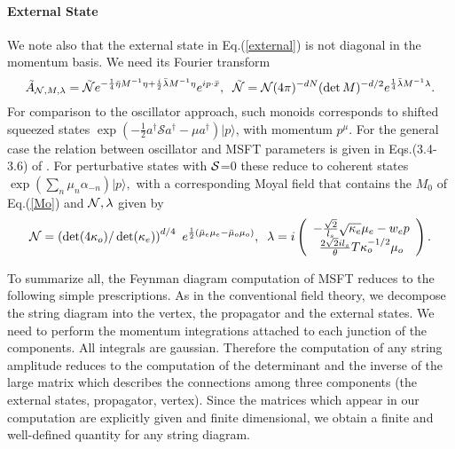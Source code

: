 \documentclass[a4paper,11pt]{article}
\begin{document}
\paragraph{External State}

We note also that the external state in Eq.(\ref{external}) is not diagonal
in the momentum basis. We need its Fourier transform
\begin{equation}
\tilde{A}_{\mathcal{N},M,\lambda }=\tilde{\mathcal{N}}e^{-\frac{1}{4}\bar{%
\eta}M^{-1}\eta +\frac{i}{2}\bar{\lambda}M^{-1}\eta }e^{ip\cdot \bar{x}},\;\;%
\tilde{\mathcal{N}}=\mathcal{N}(4\pi )^{-dN}(\det M)^{-d/2}e^{\frac{1}{4}%
\bar{\lambda}M^{-1}\lambda }.
\end{equation}%
For comparison to the oscillator approach, such monoids corresponds to
shifted squeezed states $\exp \left( -\frac{1}{2}a^{\dagger }\mathcal{S}%
a^{\dagger }-\mu a^{\dagger }\right) |p\rangle $, with momentum $p^{\mu }$.
For the general case the relation between oscillator and MSFT parameters is
given in Eqs.(3.4-3.6) of \cite{BM2}. For perturbative states with $\mathcal{%
S}$=0 these reduce to coherent states $\exp (\sum_{n}\mu _{n}\alpha
_{-n})|p\rangle ,$ with a corresponding Moyal field that contains the $M_{0}$
of Eq.(\ref{Mo}) and ${\cal N},\lambda $ given by
\begin{equation}
\mathcal{N}=\left( \det (4\kappa _{o})/\det (\kappa _{e})\right) ^{d/4}~e^{%
\frac{1}{2}(\bar{\mu}_{e}\mu _{e}-\bar{\mu}_{o}\mu _{o})},\;\;\lambda
=i\left(
\begin{array}{c}
-\frac{\sqrt{2}}{l_{s}}\sqrt{\kappa _{e}}\mu _{e}-w_{e}p \\
\frac{2\sqrt{2}il_{s}}{\theta }T\kappa _{o}^{-1/2}\mu _{o}%
\end{array}%
\right) .  \label{lambda-mu}
\end{equation}

To summarize all, the Feynman diagram computation of MSFT reduces to the
following simple prescriptions. As in the conventional field theory, we
decompose the string diagram into the vertex, the propagator and the
external states. We need to perform the momentum integrations attached to
each junction of the components. All integrals are gaussian. Therefore the
computation of any string amplitude reduces to the computation of the
determinant and the inverse of the large matrix which
describes the connections among three components
(the external states, propagator, vertex).
Since the matrices which appear in our computation are explicitly given and
finite dimensional, we obtain a finite and well-defined quantity for
any string diagram.
\end{document}
